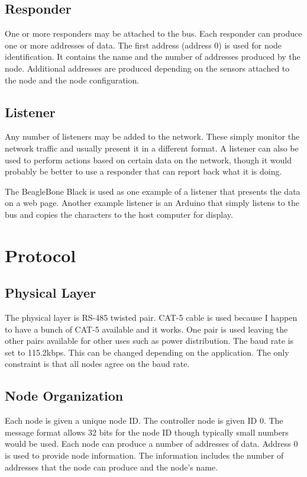 \documentclass[10pt, openany, draft]{article}
\begin{document}
\subsection{Responder}
One or more responders may be attached to the bus.  Each responder can produce one or more addresses of data.  The first address (address 0) is used for node identification.  It contains the name and the number of addresses produced by the node.  Additional addresses are produced depending on the sensors attached to the node and the node configuration.

\subsection{Listener}
Any number of listeners may be added to the network.  These simply monitor the network traffic and usually present it in a different format.  A listener can also be used to perform actions based on certain data on the network, though it would probably be better to use a responder that can report back what it is doing.

The BeagleBone Black is used as one example of a listener that presents the data on a web page.  Another example listener is an Arduino that simply listens to the bus and copies the characters to the host computer for display.

\section{Protocol}
\subsection{Physical Layer}
The physical layer is RS-485 twisted pair.  CAT-5 cable is used because I happen to have a bunch of CAT-5 available and it works.  One pair is used leaving the other pairs available for other uses such as power distribution.  The baud rate is set to 115.2kbps.  This can be changed depending on the application.  The only constraint is that all nodes agree on the baud rate.

\subsection{Node Organization}
Each node is given a unique node ID.  The controller node is given ID 0.  The message format allows 32 bits for the node ID though typically small numbers would be used.  Each node can produce a number of addresses of data.  Address 0 is used to provide node information.  The information includes the number of addresses that the node can produce and the node's name.
\end{document}
